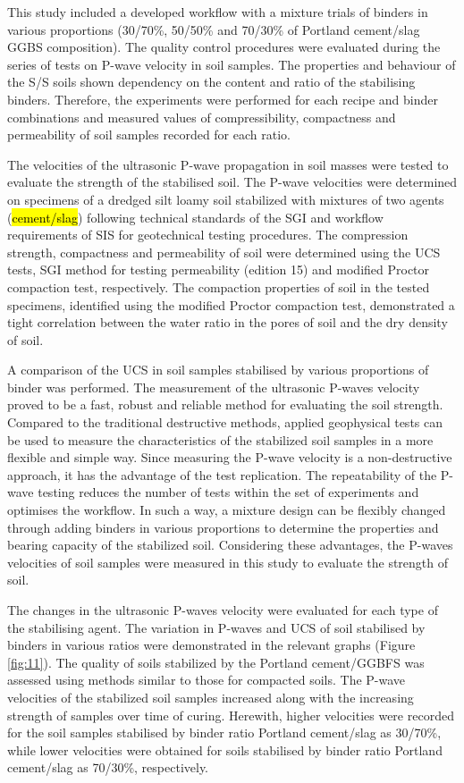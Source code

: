 \documentclass{amestyle}
\begin{document}
This study included a developed workflow with a mixture trials of binders in various proportions (30/70\%, 50/50\% and 70/30\% of Portland cement/slag GGBS composition). The quality control procedures were evaluated during the series of  tests on P-wave velocity in soil samples. The properties and behaviour of the S/S soils shown dependency on the content and ratio of the stabilising binders. Therefore, the experiments were performed for each recipe and binder combinations and measured values of compressibility, compactness and permeability of soil samples recorded for each ratio. 

The velocities of the ultrasonic P-wave propagation in soil masses were tested to evaluate the strength of the stabilised soil. The P-wave velocities were determined on specimens of a dredged silt loamy soil stabilized with mixtures of two agents (\hl{cement/slag}) following technical standards of the SGI and workflow requirements of SIS for geotechnical testing procedures. The compression strength, compactness and permeability of soil were determined using the UCS tests, SGI method for testing permeability (edition 15) and modified Proctor compaction test, respectively. The compaction properties of soil in the tested specimens, identified using the modified Proctor compaction test, demonstrated a tight correlation between the water ratio in the pores of soil and the dry density of soil.

A comparison of the UCS in soil samples stabilised by various proportions of binder was performed. The measurement of the ultrasonic P-waves velocity proved to be a fast, robust and reliable method for evaluating the soil strength. Compared to the traditional destructive methods, applied geophysical tests can be used to measure the characteristics of the stabilized soil samples in a more flexible and simple way. Since measuring the P-wave velocity is a non-destructive approach, it has the advantage of the test replication. The repeatability of the P-wave testing reduces the number of tests within the set of experiments and optimises the workflow. In such a way, a mixture design can be flexibly changed through adding binders in various proportions to determine the properties and bearing capacity of the stabilized soil. Considering these advantages, the P-waves velocities of soil samples were measured in this study to evaluate the strength of soil. 

The changes in the ultrasonic P-waves velocity were evaluated for each type of the stabilising agent. The variation in P-waves and UCS of soil stabilised by binders in various ratios were demonstrated in the relevant graphs (Figure \ref{fig:11}). The quality of soils stabilized by the Portland cement/GGBFS was assessed using methods similar to those for compacted soils. The P-wave velocities of the stabilized soil samples increased along with the increasing strength of samples over time of curing. Herewith, higher velocities were recorded for the soil samples stabilised by binder ratio Portland cement/slag as 30/70\%, while lower velocities were obtained for soils stabilised by binder ratio Portland cement/slag as 70/30\%, respectively. 
\end{document}
